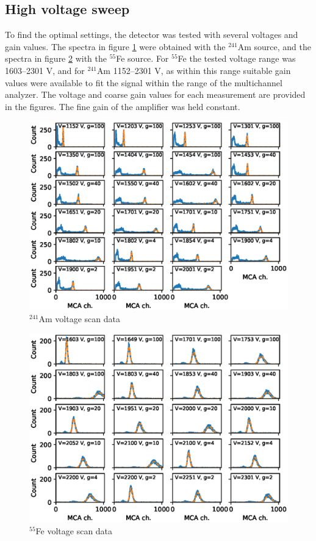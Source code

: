 \documentclass[a4paper]{article}
\begin{document}
\clearpage
\subsection{High voltage sweep}
\label{results_hv}
To find the optimal settings, the detector was tested with several voltages and gain values.
The spectra in figure \ref{fig:am_scan_fits} were obtained with the $^{241}$Am source, and the spectra in figure \ref{fig:fe_scan_fits} with the $^{55}$Fe source.
For $^{55}$Fe the tested voltage range was 1603--2301 V, and for $^{241}$Am 1152--2301 V, as within this range suitable gain values were available to fit the signal within the range of the multichannel analyzer.
The voltage and coarse gain values for each measurement are provided in the figures.
The fine gain of the amplifier was held constant.

\begin{figure}[ht!]
\centering
\includegraphics[width=\textwidth]{fig/python/am_scan_fits.eps}
\caption{$^{241}$Am voltage scan data}
\label{fig:am_scan_fits}
\end{figure}

\begin{figure}[ht!]
\centering
\includegraphics[width=\textwidth]{fig/python/fe_scan_fits.eps}
\caption{$^{55}$Fe voltage scan data}
\label{fig:fe_scan_fits}
\end{figure}
\end{document}
